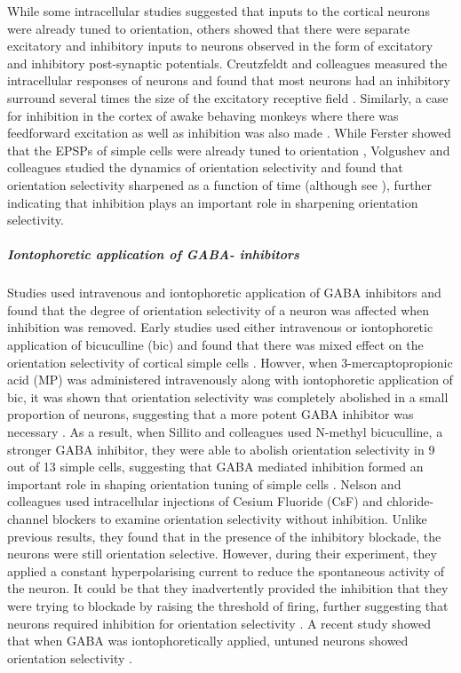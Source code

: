 While some intracellular studies suggested that inputs to the cortical neurons were already tuned to orientation, others showed that there were separate excitatory and inhibitory inputs to neurons observed in the form of excitatory and inhibitory post-synaptic potentials. Creutzfeldt and colleagues measured the intracellular responses of neurons and found that most neurons had an inhibitory surround several times the size of the excitatory receptive field \cite{Creutzfeldt1974}. Similarly, a case for inhibition in the cortex of awake behaving monkeys where there was feedforward excitation as well as inhibition was also made \cite{Celebrini1993}. While Ferster showed that the EPSPs of simple cells were already tuned to orientation \cite{Ferster1986}, Volgushev and colleagues studied the dynamics of orientation selectivity and found that orientation selectivity sharpened as a function of time \cite{Volgushev1995} (although see \cite{Celebrini1993}), further indicating that inhibition plays an important role in sharpening orientation selectivity.


\subparagraph{Iontophoretic application of GABA- inhibitors}

Studies used intravenous and iontophoretic application of GABA inhibitors and found that the degree of orientation selectivity of a neuron was affected when inhibition was removed. Early studies used either intravenous or iontophoretic application of bicuculline (bic) and found that there was mixed effect on the orientation selectivity of cortical simple cells \cite{Pettigrew1973, Sillito1975}. Howver, when 3-mercaptopropionic acid (MP) was administered intravenously along with iontophoretic application of bic, it was shown that orientation selectivity was completely abolished in a small proportion of neurons, suggesting that a more potent GABA inhibitor was necessary \cite{Tsumoto1979}. As a result, when Sillito and colleagues used N-methyl bicuculline, a stronger GABA inhibitor, they were able to abolish orientation selectivity in 9 out of 13 simple cells, suggesting that GABA mediated inhibition formed an important role in  shaping orientation tuning of simple cells \cite{Sillito1980}. Nelson and colleagues used intracellular injections of Cesium Fluoride (CsF) and chloride-channel blockers to examine orientation selectivity without inhibition. Unlike previous results, they found that in the presence of the inhibitory blockade, the neurons were still orientation selective. However, during their experiment, they applied a constant hyperpolarising current to reduce the spontaneous activity of the neuron. It could be that they inadvertently provided the inhibition that they were trying to blockade by raising the threshold of firing, further suggesting that neurons required inhibition for orientation selectivity \cite{Nelson1994}. A recent study showed that when GABA was iontophoretically applied, untuned neurons showed orientation selectivity \cite{Li2008}.

